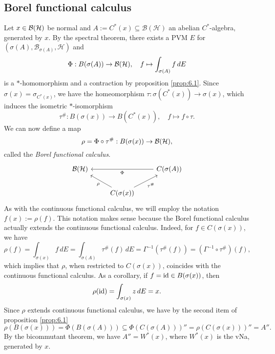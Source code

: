 \begin{comment}
\begin{lemma}[Goldstine's theorem]
  Let $X$ be a Banach space. Then the image of 
  $$\iota: X \to X^{**},\quad x \mapsto (f \mapsto f(x))$$
  is dense in the weak-$*$ topology.
\end{lemma}

\begin{myproof}
  Let $\beta \in X^{**}$ and $f_1, \dots, f_r \in X^*$ (w.l.o.g. linearly independent).
  The set
  $$U = \{\alpha \in X^{**}\ |\ |(\alpha - \beta) (f_j)| < \varepsilon,\ j = 1, \dots, r\}$$
  is a basic weak-$*$ open set in $X^{**}$.
  Assume $X$ is infinite-dimensional. Consider the surjective linear map 
  $$\Phi: X \to \C^r,\quad x \mapsto (f_1 (x),\dots, f_r (x)).$$
  Then, there exists $x_0 \in X$ such that 
  $$\Phi(x_0) = (\beta(f_1), \dots, \beta(f_r)),$$
  hence $\iota (x_0) \in U \cap \iota (X)$.
\end{myproof}
\end{comment}

\subsection{Borel functional calculus}

Let $x \in \operatorname{\mathcal{B} (\mathcal{H})}$ be normal and $A := C^* (x) \subseteq \mathcal{B}(\mathcal{H})$ an abelian $C^*$-algebra, generated by $x$.
By the spectral theorem, there exists a PVM $E$ for $(\sigma(A), \mathcal{B}_{\sigma(A)}, \mathcal{H})$ 
and 
$$\Phi: B (\sigma(A)) \to \operatorname{\mathcal{B} (\mathcal{H})},\quad f \mapsto \int_{\sigma(A)} f\, dE$$
is a $*$-homomorphism and a contraction by proposition \ref{prop:6.1}.
Since $\sigma(x) = \sigma_{C^* (x)}$, we have the homeomorphism $\tau: \sigma(C^* (x)) \to \sigma(x)$, which induces
the isometric $*$-isomorphism 
$$\tau^{\#}: B(\sigma(x)) \to B(C^* (x)),\quad f \mapsto f \circ \tau.$$
We can now define a map 
$$\rho = \Phi \circ \tau^{\#}: B(\sigma(x)) \to \operatorname{\mathcal{B} (\mathcal{H})},$$
called the \emph{Borel functional calculus}. 
\[\begin{tikzcd}
	{\bh} && {C(\sigma(A))} \\
	& {C(\sigma(x))}
	\arrow["{\tau^{\#}}"', from=2-2, to=1-3]
	\arrow["\rho", from=2-2, to=1-1]
	\arrow["\Phi", from=1-3, to=1-1]
\end{tikzcd}\]
As with the continuous functional calculus, we will employ the notation $f(x) := \rho(f)$.
This notation makes sense because the Borel functional calculus actually extends the continuous functional calculus.
Indeed, for $f \in C(\sigma(x))$, we have
$$\rho (f) = \int_{\sigma(x)} f\, dE = \int_{\sigma(A)} \tau^{\#}(f)\, dE = \Gamma^{-1} (\tau^{\#}(f)) = (\Gamma^{-1} \circ \tau^{\#})(f),$$
which implies that $\rho$, when restricted to $C(\sigma(x))$, coincides with the continuous functional calculus.
As a corollary, if $f = \operatorname{id} \in B(\sigma(x))$, then 
$$\rho (\operatorname{id}) = \int_{\sigma (x)} z \, dE = x.$$
Since $\rho$ extends continuous functional calculus, we have by the second item of proposition \ref{prop:6.1}
$$\rho (B(\sigma(x))) = \Phi (B(\sigma(A))) \subseteq \Phi (C(\sigma(A)))'' = \rho (C(\sigma(x)))'' = A''.$$
By the bicommutant theorem, we have $A'' = W^*(x)$, where $W^* (x)$ is the vNa, generated by $x$.

